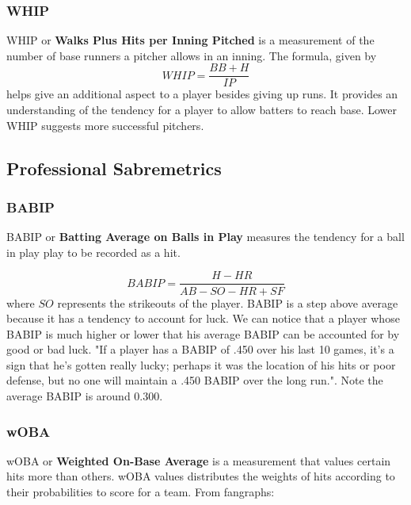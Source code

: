 \documentclass[12pt]{article}
\numberwithin{equation}{subsection}
\begin{document}
\subsubsection{WHIP}
WHIP or \textbf{Walks Plus Hits per Inning Pitched} is a measurement of the number of base runners a pitcher allows in an inning. The formula, given by
\begin{equation}
	WHIP = \frac{BB + H}{IP}
\end{equation}
helps give an additional aspect to a player besides giving up runs. It provides an understanding of the tendency for a player to allow batters to reach base. Lower WHIP suggests more successful pitchers.

\subsection{Professional Sabremetrics}
\subsubsection{BABIP}
BABIP or \textbf{Batting Average on Balls in Play} measures the tendency for a ball in play play to be recorded as a hit. 

\begin{equation}
	BABIP = \frac{H-HR}{AB-SO-HR+SF}
\end{equation}
where $SO$ represents the strikeouts of the player.
BABIP is a step above average because it has a tendency to account for luck. We can notice that a player whose BABIP is much higher or lower that his average BABIP can be accounted for by good or bad luck. "If a player has a BABIP of .450 over his last 10 games, it’s a sign that he’s gotten really lucky; perhaps it was the location of his hits or poor defense, but no one will maintain a .450 BABIP over the long run."\cite{Bales}. Note the average BABIP is around 0.300.

\subsubsection{wOBA}
wOBA or \textbf{Weighted On-Base Average} is a measurement that values certain hits more than others. wOBA values distributes the weights of hits according to their probabilities to score for a team. From fangraphs\cite{fangraphs}: 
\end{document}
